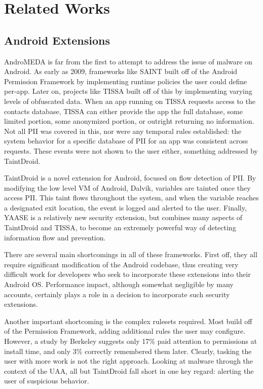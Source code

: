 \chapter{Related Works}
\label{sec:relatedworks}


\section{Android Extensions}
AndroMEDA is far from the first to attempt to address the issue of malware on Android. As early as 2009, frameworks like SAINT\citep{ongtang2012semantically} built off of the Android Permission Framework by implementing runtime policies the user could define per-app. Later on, projects like TISSA\citep{zhou2011taming} built off of this by implementing varying levels of obfuscated data. When an app running on TISSA requests access to the contacts database, TISSA can either provide the app the full database, some limited portion, some anonymized portion, or outright returning no information. Not all PII was covered in this, nor were any temporal rules established: the system behavior for a specific database of PII for an app was consistent across requests. These events were not shown to the user either, something addressed by TaintDroid\citep{enck2010taintdroid}.

TaintDroid is a novel extension for Android, focused on flow detection of PII. By modifying the low level VM of Android, Dalvik, variables are tainted once they access PII. This taint flows throughout the system, and when the variable reaches a designated exit location, the event is logged and alerted to the user. Finally, YAASE\citep{russello2011yaase} is a relatively new security extension, but combines many aspects of TaintDroid and TISSA, to become an extremely powerful way of detecting information flow and prevention.

There are several main shortcomings in all of these frameworks. First off, they all require significant modification of the Android codebase, thus creating very difficult work for developers who seek to incorporate these extensions into their Android OS. Performance impact, although somewhat negligible by many accounts, certainly plays a role in a decision to incorporate such security extensions.

Another important shortcoming is the complex rulesets required. Most build off of the Permission Framework, adding additional rules the user may configure. However, a study by Berkeley suggests only 17\% paid attention to permissions at install time, and only 3\% correctly remembered them later\citep{felt2012android}. Clearly, tasking the user with more work is not the right approach. Looking at malware through the context of the UAA, all but TaintDroid fall short in one key regard: alerting the user of suspicious behavior.

